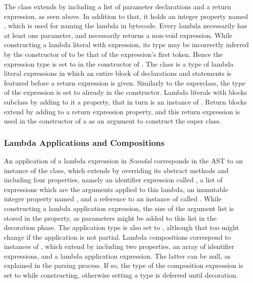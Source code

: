 The  class extends  by including a list of parameter declarations and a return expression, as seen above. In addition to that, it holds an integer property named , which is used for naming the lambda in bytecode. Every lambda necessarily has at least one parameter, and necessarily returns a non-void expression. While constructing a lambda literal with expression, its type may be incorrectly inferred by the constructor of  to be that of the expression's first token. Hence the expression type is set to  in the constructor of . The  class is a type of lambda literal expressions in which an entire block of declarations and statements is featured before a return expression is given. Similarly to the superclass, the type of the expression is set to  already in the constructor. Lambda literals with blocks subclass  by adding to it a  property, that in turn is an instance of . Return blocks extend  by adding to  a return expression property, and this return expression is used in the constructor of a  as an argument to construct the  super class.

\subsubsection{Lambda Applications and Compositions}

An application of a lambda expression in \emph{Scandal} corresponds in the AST to an instance of the  class, which extends  by overriding its abstract methods and including four properties, namely an identifier expression called , a list of expressions which are the arguments applied to this lambda, an immutable integer property named , and a reference to an instance of  called . While constructing a lambda application expression, the size of the argument list is stored in the  property, as parameters might be added to this list in the decoration phase. The application type is also set to , although that too might change if the application is not partial. Lambda compositions correspond to instances of , which extend  by including two properties, an array of identifier expressions, and a lambda application expression. The latter can be null, as explained in the parsing process. If so, the type of the composition expression is set to  while constructing, otherwise setting a type is deferred until decoration.